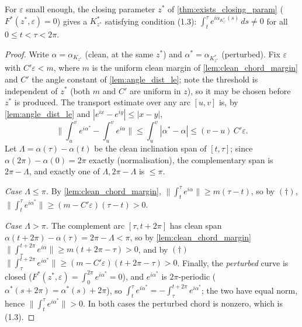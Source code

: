 \begin{lemma}

  \label{lem:simplicity_transport}
  For $\varepsilon$ small enough, the closing parameter $z^*$ of
  \cref{thm:exists_closing_param} ($F^*(z^*,\varepsilon)=0$) gives a $K^*_{z^*}$
  satisfying condition (1.3):
  $\int_t^\tau e^{i\alpha_{K^*_{z^*}}(s)}\,ds\neq 0$ for all $0\le t<\tau<2\pi$.
\end{lemma}
\begin{proof}
  \leanok
  Write $\alpha=\alpha_{K_{z^*}}$ (clean, at the same $z^*$) and $\alpha^*=\alpha_{K^*_{z^*}}$
  (perturbed). Fix $\varepsilon$ with $C'\varepsilon<m$, where $m$ is the uniform clean
  margin of \cref{lem:clean_chord_margin} and $C'$ the angle constant of
  \cref{lem:angle_dist_le}; note the threshold is independent of $z^*$ (both $m$ and $C'$
  are uniform in $z$), so it may be chosen before $z^*$ is produced. The transport
  estimate over any arc $[u,v]$ is, by \cref{lem:angle_dist_le} and $|e^{ix}-e^{iy}|\le|x-y|$,
  \[
    \bigl\|\textstyle\int_u^v e^{i\alpha^*}-\int_u^v e^{i\alpha}\bigr\|
    \le\int_u^v|\alpha^*-\alpha|\le(v-u)\,C'\varepsilon . \tag{$\dagger$}
  \]
  Let $\Lambda=\alpha(\tau)-\alpha(t)$ be the clean inclination span of $[t,\tau]$;
  since $\alpha(2\pi)-\alpha(0)=2\pi$ exactly (normalisation), the complementary span is
  $2\pi-\Lambda$, and exactly one of $\Lambda,2\pi-\Lambda$ is $\le\pi$.

  \emph{Case $\Lambda\le\pi$.} By \cref{lem:clean_chord_margin},
  $\|\int_t^\tau e^{i\alpha}\|\ge m(\tau-t)$, so by $(\dagger)$,
  $\|\int_t^\tau e^{i\alpha^*}\|\ge(m-C'\varepsilon)(\tau-t)>0$.

  \emph{Case $\Lambda>\pi$.} The complement arc $[\tau,t+2\pi]$ has clean span
  $\alpha(t+2\pi)-\alpha(\tau)=2\pi-\Lambda<\pi$, so by \cref{lem:clean_chord_margin}
  $\|\int_\tau^{t+2\pi}e^{i\alpha}\|\ge m(t+2\pi-\tau)>0$, and by $(\dagger)$
  $\|\int_\tau^{t+2\pi}e^{i\alpha^*}\|\ge(m-C'\varepsilon)(t+2\pi-\tau)>0$. Finally, the
  \emph{perturbed} curve is closed ($F^*(z^*,\varepsilon)=\int_0^{2\pi}e^{i\alpha^*}=0$),
  and $e^{i\alpha^*}$ is $2\pi$-periodic ($\alpha^*(s+2\pi)=\alpha^*(s)+2\pi$), so
  $\int_t^\tau e^{i\alpha^*}=-\int_\tau^{t+2\pi}e^{i\alpha^*}$; the two have equal norm,
  hence $\|\int_t^\tau e^{i\alpha^*}\|>0$. In both cases the perturbed chord is nonzero,
  which is (1.3).
\end{proof}

